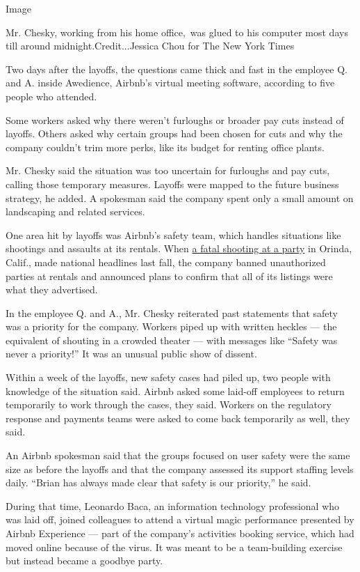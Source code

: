 Image

Mr. Chesky, working from his home office,~was glued to his computer most
days till around midnight.Credit...Jessica Chou for The New York Times

Two days after the layoffs, the questions came thick and fast in the
employee Q. and A. inside Awedience, Airbnb's virtual meeting software,
according to five people who attended.

Some workers asked why there weren't furloughs or broader pay cuts
instead of layoffs. Others asked why certain groups had been chosen for
cuts and why the company couldn't trim more perks, like its budget for
renting office plants.

Mr. Chesky said the situation was too uncertain for furloughs and pay
cuts, calling those temporary measures. Layoffs were mapped to the
future business strategy, he added. A spokesman said the company spent
only a small amount on landscaping and related services.

One area hit by layoffs was Airbnb's safety team, which handles
situations like shootings and assaults at its rentals. When
\href{https://www.nytimes.com/2019/11/01/us/orinda-shooting.html}{a
fatal shooting at a party} in Orinda, Calif., made national headlines
last fall, the company banned unauthorized parties at rentals and
announced plans to confirm that all of its listings were what they
advertised.

In the employee Q. and A., Mr. Chesky reiterated past statements that
safety was a priority for the company. Workers piped up with written
heckles --- the equivalent of shouting in a crowded theater --- with
messages like ``Safety was never a priority!'' It was an unusual public
show of dissent.

Within a week of the layoffs, new safety cases had piled up, two people
with knowledge of the situation said. Airbnb asked some laid-off
employees to return temporarily to work through the cases, they said.
Workers on the regulatory response and payments teams were asked to come
back temporarily as well, they said.

An Airbnb spokesman said that the groups focused on user safety were the
same size as before the layoffs and that the company assessed its
support staffing levels daily. ``Brian has always made clear that safety
is our priority,'' he said.

During that time, Leonardo Baca, an information technology professional
who was laid off, joined colleagues to attend a virtual magic
performance presented by Airbnb Experience --- part of the company's
activities booking service, which had moved online because of the virus.
It was meant to be a team-building exercise but instead became a goodbye
party.

